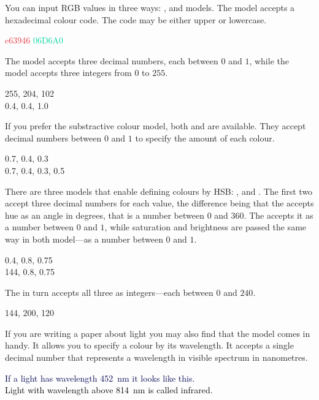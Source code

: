 You can input RGB values in three ways: ,  and
 models. The  model accepts a hexadecimal colour code.
The code may be either upper or lowercase.
\begin{example}
\textcolor[HTML]{e63946}{e63946}
\textcolor[HTML]{06D6A0}{06D6A0}
\end{example}
The  model accepts three decimal numbers, each between \(0\) and
\(1\), while the  model accepts three integers from \(0\) to \(255\).
\begin{example}
\textcolor[RGB]{255, 204, 102}{
  255, 204, 102
} \\
\textcolor[rgb]{0.4, 0.4, 1.0}{
  0.4, 0.4, 1.0
}
\end{example}

If you prefer the substractive colour model, both  and  are
available. They accept decimal numbers between \(0\) and \(1\) to specify
the amount of each colour.
\begin{example}
\textcolor[cmy]{0.7, 0.4, 0.3}{
  0.7, 0.4, 0.3
} \\
\textcolor[cmyk]{
  0.7, 0.4, 0.3, 0.5
}{
  0.7, 0.4, 0.3, 0.5
}
\end{example}

There are three models that enable defining colours by HSB\@: ,
 and . The first two accept three decimal numbers for
each value, the difference being that the  accepts hue as an angle
in degrees, that is a number between \(0\) and \(360\). The  accepts
it as a number between \(0\) and \(1\), while saturation and brightness
are passed the same way in both model---as a number between \(0\) and \(1\).
\begin{example}
\textcolor[hsb]{
  0.4, 0.8, 0.75
}{
  0.4, 0.8, 0.75
}\\
\textcolor[Hsb]{
  144, 0.8, 0.75
}{
  144, 0.8, 0.75
}
\end{example}
The  in turn accepts all three as integers---each between \(0\) and
\(240\).
\begin{example}
\textcolor[HSB]{
  144, 200, 120
}{
  144, 200, 120
}
\end{example}

If you are writing a paper about light you may also find that the 
model comes in handy. It allows you to specify a colour by its wavelength. It
accepts a single decimal number that represents a wavelength in visible
spectrum in nanometres.
\begin{example}
\textcolor[wave]{452}{
  If a light has wavelength
  \qty{452}{\nm} it looks
  like this.  
} \\
\textcolor[wave]{700}{
  Light with wavelength above
  \qty{814}{\nm} is called
  infrared.
}
\end{example}

